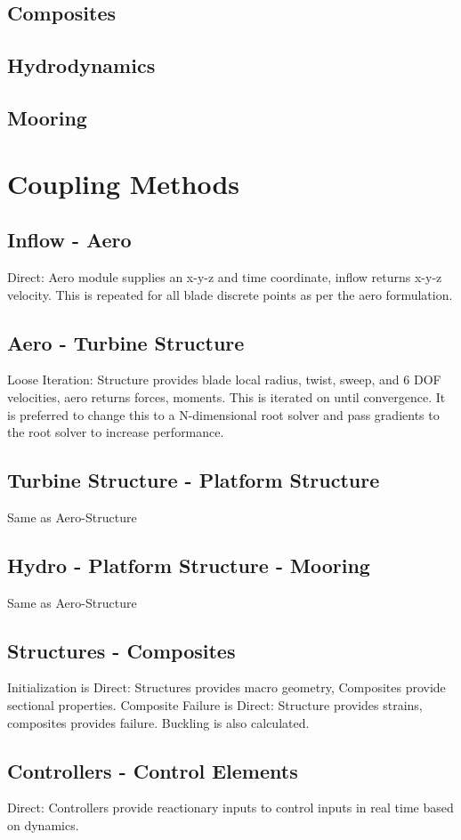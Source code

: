 \documentclass[11pt]{article}
\begin{document}
\subsection{Composites}
\subsection{Hydrodynamics}
\subsection{Mooring}

\section{Coupling Methods}

\subsection{Inflow - Aero}
Direct: Aero module supplies an x-y-z and time coordinate, inflow returns x-y-z velocity.  This is repeated for all blade discrete points as per the aero formulation.
\subsection{Aero - Turbine Structure}
Loose Iteration: Structure provides blade local radius, twist, sweep, and 6 DOF velocities, aero returns forces, moments. This is iterated on until convergence.  It is preferred to change this to a N-dimensional root solver and pass gradients to the root solver to increase performance.
\subsection{Turbine Structure - Platform Structure}
Same as Aero-Structure
\subsection{Hydro - Platform Structure - Mooring}
Same as Aero-Structure
\subsection{Structures - Composites}
Initialization is Direct: Structures provides macro geometry, Composites provide sectional properties. Composite Failure is Direct: Structure provides strains, composites provides failure.  Buckling is also calculated.
\subsection{Controllers - Control Elements}
Direct: Controllers provide reactionary inputs to control inputs in real time based on dynamics.
\end{document}
